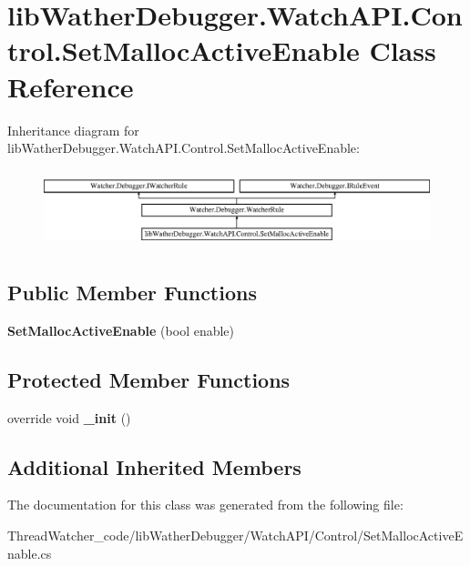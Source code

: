 \hypertarget{classlib_wather_debugger_1_1_watch_a_p_i_1_1_control_1_1_set_malloc_active_enable}{\section{lib\+Wather\+Debugger.\+Watch\+A\+P\+I.\+Control.\+Set\+Malloc\+Active\+Enable Class Reference}
\label{classlib_wather_debugger_1_1_watch_a_p_i_1_1_control_1_1_set_malloc_active_enable}
}
Inheritance diagram for lib\+Wather\+Debugger.\+Watch\+A\+P\+I.\+Control.\+Set\+Malloc\+Active\+Enable\+:\begin{figure}[H]
\begin{center}
\leavevmode
\includegraphics[height=2.282609cm]{classlib_wather_debugger_1_1_watch_a_p_i_1_1_control_1_1_set_malloc_active_enable}
\end{center}
\end{figure}
\subsection*{Public Member Functions}
\begin{DoxyCompactItemize}
\item 
\hypertarget{classlib_wather_debugger_1_1_watch_a_p_i_1_1_control_1_1_set_malloc_active_enable_aee3b56187aeef1d0aad2ea6b8e9bc331}{{\bfseries Set\+Malloc\+Active\+Enable} (bool enable)}\label{classlib_wather_debugger_1_1_watch_a_p_i_1_1_control_1_1_set_malloc_active_enable_aee3b56187aeef1d0aad2ea6b8e9bc331}

\end{DoxyCompactItemize}
\subsection*{Protected Member Functions}
\begin{DoxyCompactItemize}
\item 
\hypertarget{classlib_wather_debugger_1_1_watch_a_p_i_1_1_control_1_1_set_malloc_active_enable_ab67ef0976c22aee27ec7878231e690c2}{override void {\bfseries \+\_\+init} ()}\label{classlib_wather_debugger_1_1_watch_a_p_i_1_1_control_1_1_set_malloc_active_enable_ab67ef0976c22aee27ec7878231e690c2}

\end{DoxyCompactItemize}
\subsection*{Additional Inherited Members}


The documentation for this class was generated from the following file\+:\begin{DoxyCompactItemize}
\item 
Thread\+Watcher\+\_\+code/lib\+Wather\+Debugger/\+Watch\+A\+P\+I/\+Control/Set\+Malloc\+Active\+Enable.\+cs\end{DoxyCompactItemize}
